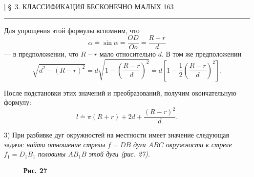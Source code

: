 \documentclass[a4paper,12pt]{article}
\begin{document}
] \hfill \S~3. КЛАССИФИКАЦИЯ БЕСКОНЕЧНО МАЛЫХ \hfill 163
\vspace{1em}
\hrule
\vspace{1.5em}

Для упрощения этой формулы вспомним, что
\begin{equation*}
    \alpha \doteq \sin \alpha = \frac{OD}{Oo} = \frac{R - r}{d}
\end{equation*}
--- в предположении, что $R - r$ мало относительно $d$. В том же предположении
\begin{equation*}
    \sqrt{d^2 - (R - r)^2} = d\sqrt{1 - \left(\frac{R - r}{d}\right)^2} \doteq d \left[ 1 - \frac{1}{2} \left( \frac{R - r}{d} \right)^2 \right].
\end{equation*}

После подстановки этих значений и преобразований, получим окончательную формулу:
\begin{equation*}
    l \doteq \pi(R + r) + 2d + \frac{(R - r)^2}{d}.
\end{equation*}

3) При разбивке дуг окружностей на местности имеет значение следующая задача: \textit{найти отношение стрелы $f = DB$ дуги $ABC$ окружности к стреле $f_1 = D_1B_1$ половины $AB_1B$ этой дуги (рис. 27).}

\begin{figure}
    \centering
    \small \textbf{Рис. 27}
\end{figure}
\end{document}
